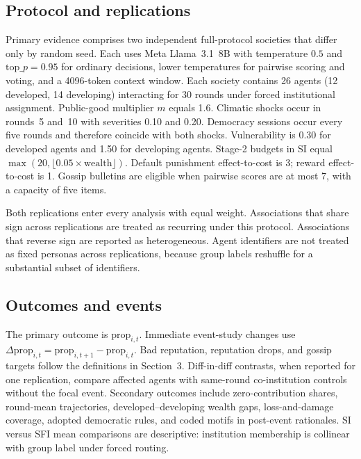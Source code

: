 \subsection{Protocol and replications}

Primary evidence comprises two independent full-protocol societies that differ only by random seed.
Each uses Meta Llama~3.1~8B with temperature $0.5$ and $\mathrm{top}\_p=0.95$ for ordinary decisions, lower temperatures for pairwise scoring and voting, and a 4096-token context window.
Each society contains 26 agents (12 developed, 14 developing) interacting for 30 rounds under forced institutional assignment.
Public-good multiplier $m$ equals 1.6.
Climatic shocks occur in rounds~5 and~10 with severities 0.10 and 0.20.
Democracy sessions occur every five rounds and therefore coincide with both shocks.
Vulnerability is 0.30 for developed agents and 1.50 for developing agents.
Stage-2 budgets in SI equal $\max(20,\lfloor 0.05\times\mathrm{wealth}\rfloor)$.
Default punishment effect-to-cost is 3; reward effect-to-cost is 1.
Gossip bulletins are eligible when pairwise scores are at most 7, with a capacity of five items.

Both replications enter every analysis with equal weight.
Associations that share sign across replications are treated as recurring under this protocol.
Associations that reverse sign are reported as heterogeneous.
Agent identifiers are not treated as fixed personas across replications, because group labels reshuffle for a substantial subset of identifiers.

\subsection{Outcomes and events}

The primary outcome is $\mathrm{prop}_{i,t}$.
Immediate event-study changes use $\Delta\mathrm{prop}_{i,t}=\mathrm{prop}_{i,t+1}-\mathrm{prop}_{i,t}$.
Bad reputation, reputation drops, and gossip targets follow the definitions in Section~3.
Diff-in-diff contrasts, when reported for one replication, compare affected agents with same-round co-institution controls without the focal event.
Secondary outcomes include zero-contribution shares, round-mean trajectories, developed--developing wealth gaps, loss-and-damage coverage, adopted democratic rules, and coded motifs in post-event rationales.
SI versus SFI mean comparisons are descriptive: institution membership is collinear with group label under forced routing.

